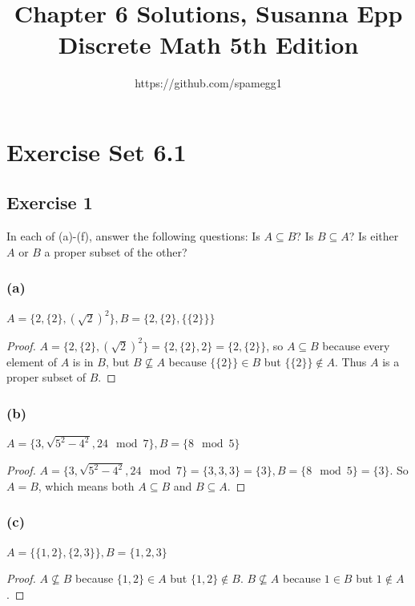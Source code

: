 \documentclass[14pt]{extarticle}
\title{Chapter 6 Solutions, Susanna Epp Discrete Math 5th Edition}
\author{https://github.com/spamegg1}
\begin{document}
\maketitle
\tableofcontents

\section{Exercise Set 6.1}

\subsection{Exercise 1}
In each of (a)-(f), answer the following questions: Is \(A \subseteq B\)? Is \(B \subseteq A\)? 
Is either $A$ or $B$ a proper subset of the other?

\subsubsection{(a)}
\(A = \{2, \{2\}, (\sqrt{2})^2\}, B = \{2, \{2\}, \{\{2\}\}\}\)

\begin{proof}
\(A = \{2, \{2\}, (\sqrt{2})^2\} = \{2, \{2\}, 2\} = \{2, \{2\}\}\), so \(A \subseteq B\) because every element of $A$
is in $B$, but \(B \nsubseteq A\) because \(\{\{2\}\} \in B\) but \(\{\{2\}\} \notin A\). Thus $A$ is a proper subset of $B$.
\end{proof}

\subsubsection{(b)}
\(A = \{3, \sqrt{5^2 - 4^2}, 24 \mod 7\}, B = \{8 \mod 5\}\)

\begin{proof}
\(A = \{3, \sqrt{5^2 - 4^2}, 24 \mod 7\} = \{3, 3, 3\} = \{3\}, B = \{8 \mod 5\} = \{3\}\). So $A = B$, which means
both \(A \subseteq B\) and \(B \subseteq A\).
\end{proof}

\subsubsection{(c)}
\(A = \{\{1, 2\}, \{2, 3\}\}, B = \{1, 2, 3\}\)

\begin{proof}
\(A \nsubseteq B\) because $\{1, 2\} \in A$ but $\{1, 2\} \notin B$.
\(B \nsubseteq A\) because $1 \in B$ but $1 \notin A$.
\end{proof}
\end{document}
